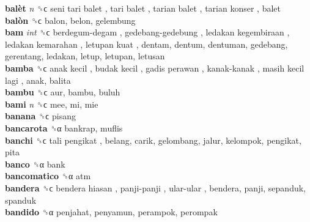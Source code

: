 \textbf{balèt} \emph{n}  ␝ϲ   seni tari balet ,  tari balet ,  tarian balet ,  tarian konser , balet  \\
\textbf{balòn} ␝ϲ  balon, belon, gelembung  \\
\textbf{bam} \emph{int}  ␝ϲ   berdegum-degam ,  gedebang-gedebung ,  ledakan kegembiraan ,  ledakan kemarahan ,  letupan kuat , dentam, dentum, dentuman, gedebang, gerentang, ledakan, letup, letupan, letusan  \\
\textbf{bamba} ␝ϲ   anak kecil ,  budak kecil ,  gadis perawan ,  kanak-kanak ,  masih kecil lagi , anak, balita  \\
\textbf{bambu} ␝ϲ  aur, bambu, buluh  \\
\textbf{bami} \emph{n}  ␝ϲ  mee, mi, mie  \\
\textbf{banana} ␝ϲ  pisang  \\
\textbf{bancarota} ␝α  bankrap, muflis  \\
\textbf{banchi} ␝ϲ   tali pengikat , belang, carik, gelombang, jalur, kelompok, pengikat, pita  \\
\textbf{banco} ␝α  bank  \\
\textbf{bancomatico} ␝α  atm  \\
\textbf{bandera} ␝ϲ   bendera hiasan ,  panji-panji ,  ular-ular , bendera, panji, sepanduk, spanduk  \\
\textbf{bandido} ␝α  penjahat, penyamun, perampok, perompak  \\
